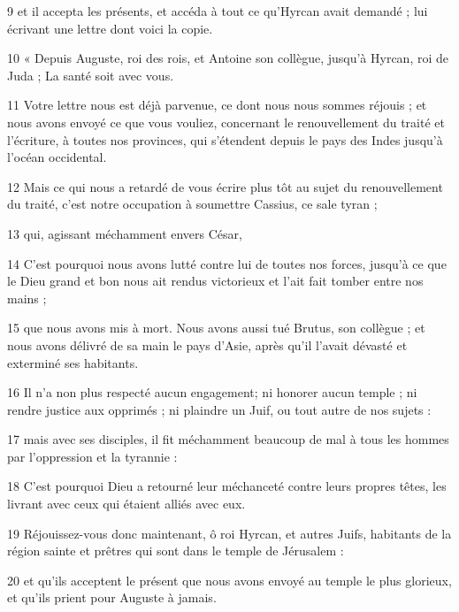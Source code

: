 \par 9 et il accepta les présents, et accéda à tout ce qu'Hyrcan avait demandé ; lui écrivant une lettre dont voici la copie.

\par 10 « Depuis Auguste, roi des rois, et Antoine son collègue, jusqu'à Hyrcan, roi de Juda ; La santé soit avec vous.

\par 11 Votre lettre nous est déjà parvenue, ce dont nous nous sommes réjouis ; et nous avons envoyé ce que vous vouliez, concernant le renouvellement du traité et l'écriture, à toutes nos provinces, qui s'étendent depuis le pays des Indes jusqu'à l'océan occidental.

\par 12 Mais ce qui nous a retardé de vous écrire plus tôt au sujet du renouvellement du traité, c'est notre occupation à soumettre Cassius, ce sale tyran ;

\par 13 qui, agissant méchamment envers César,

\par 14 C'est pourquoi nous avons lutté contre lui de toutes nos forces, jusqu'à ce que le Dieu grand et bon nous ait rendus victorieux et l'ait fait tomber entre nos mains ;

\par 15 que nous avons mis à mort. Nous avons aussi tué Brutus, son collègue ; et nous avons délivré de sa main le pays d'Asie, après qu'il l'avait dévasté et exterminé ses habitants.

\par 16 Il n'a non plus respecté aucun engagement; ni honorer aucun temple ; ni rendre justice aux opprimés ; ni plaindre un Juif, ou tout autre de nos sujets :

\par 17 mais avec ses disciples, il fit méchamment beaucoup de mal à tous les hommes par l'oppression et la tyrannie :

\par 18 C'est pourquoi Dieu a retourné leur méchanceté contre leurs propres têtes, les livrant avec ceux qui étaient alliés avec eux.

\par 19 Réjouissez-vous donc maintenant, ô roi Hyrcan, et autres Juifs, habitants de la région sainte et prêtres qui sont dans le temple de Jérusalem :

\par 20 et qu'ils acceptent le présent que nous avons envoyé au temple le plus glorieux, et qu'ils prient pour Auguste à jamais.

